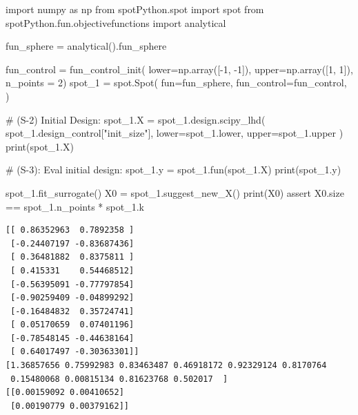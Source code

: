 \documentclass[
  letterpaper,
  DIV=11,
  numbers=noendperiod]{scrreprt}
\newenvironment{Shaded}{\begin{snugshade}}{\end{snugshade}}
\newcommand{\BuiltInTok}[1]{\textcolor[rgb]{0.00,0.23,0.31}{#1}}
\newcommand{\CommentTok}[1]{\textcolor[rgb]{0.37,0.37,0.37}{#1}}
\newcommand{\ControlFlowTok}[1]{\textcolor[rgb]{0.00,0.23,0.31}{#1}}
\newcommand{\DecValTok}[1]{\textcolor[rgb]{0.68,0.00,0.00}{#1}}
\newcommand{\ImportTok}[1]{\textcolor[rgb]{0.00,0.46,0.62}{#1}}
\newcommand{\NormalTok}[1]{\textcolor[rgb]{0.00,0.23,0.31}{#1}}
\newcommand{\OperatorTok}[1]{\textcolor[rgb]{0.37,0.37,0.37}{#1}}
\newcommand{\StringTok}[1]{\textcolor[rgb]{0.13,0.47,0.30}{#1}}
\begin{document}
\begin{Shaded}
\begin{Highlighting}[]
\ImportTok{import}\NormalTok{ numpy }\ImportTok{as}\NormalTok{ np}
\ImportTok{from}\NormalTok{ spotPython.spot }\ImportTok{import}\NormalTok{ spot}
\ImportTok{from}\NormalTok{ spotPython.fun.objectivefunctions }\ImportTok{import}\NormalTok{ analytical}

\NormalTok{fun\_sphere }\OperatorTok{=}\NormalTok{ analytical().fun\_sphere}

\NormalTok{fun\_control }\OperatorTok{=}\NormalTok{ fun\_control\_init(}
\NormalTok{                    lower}\OperatorTok{=}\NormalTok{np.array([}\OperatorTok{{-}}\DecValTok{1}\NormalTok{, }\OperatorTok{{-}}\DecValTok{1}\NormalTok{]),}
\NormalTok{                    upper}\OperatorTok{=}\NormalTok{np.array([}\DecValTok{1}\NormalTok{, }\DecValTok{1}\NormalTok{]),}
\NormalTok{                    n\_points }\OperatorTok{=} \DecValTok{2}\NormalTok{)}
\NormalTok{spot\_1 }\OperatorTok{=}\NormalTok{ spot.Spot(}
\NormalTok{    fun}\OperatorTok{=}\NormalTok{fun\_sphere,}
\NormalTok{    fun\_control}\OperatorTok{=}\NormalTok{fun\_control,}
\NormalTok{)}

\CommentTok{\# (S{-}2) Initial Design:}
\NormalTok{spot\_1.X }\OperatorTok{=}\NormalTok{ spot\_1.design.scipy\_lhd(}
\NormalTok{    spot\_1.design\_control[}\StringTok{"init\_size"}\NormalTok{], lower}\OperatorTok{=}\NormalTok{spot\_1.lower, upper}\OperatorTok{=}\NormalTok{spot\_1.upper}
\NormalTok{)}
\BuiltInTok{print}\NormalTok{(spot\_1.X)}

\CommentTok{\# (S{-}3): Eval initial design:}
\NormalTok{spot\_1.y }\OperatorTok{=}\NormalTok{ spot\_1.fun(spot\_1.X)}
\BuiltInTok{print}\NormalTok{(spot\_1.y)}

\NormalTok{spot\_1.fit\_surrogate()}
\NormalTok{X0 }\OperatorTok{=}\NormalTok{ spot\_1.suggest\_new\_X()}
\BuiltInTok{print}\NormalTok{(X0)}
\ControlFlowTok{assert}\NormalTok{ X0.size }\OperatorTok{==}\NormalTok{ spot\_1.n\_points }\OperatorTok{*}\NormalTok{ spot\_1.k}
\end{Highlighting}
\end{Shaded}

\begin{verbatim}
[[ 0.86352963  0.7892358 ]
 [-0.24407197 -0.83687436]
 [ 0.36481882  0.8375811 ]
 [ 0.415331    0.54468512]
 [-0.56395091 -0.77797854]
 [-0.90259409 -0.04899292]
 [-0.16484832  0.35724741]
 [ 0.05170659  0.07401196]
 [-0.78548145 -0.44638164]
 [ 0.64017497 -0.30363301]]
[1.36857656 0.75992983 0.83463487 0.46918172 0.92329124 0.8170764
 0.15480068 0.00815134 0.81623768 0.502017  ]
[[0.00159092 0.00410652]
 [0.00190779 0.00379162]]
\end{verbatim}
\end{document}
